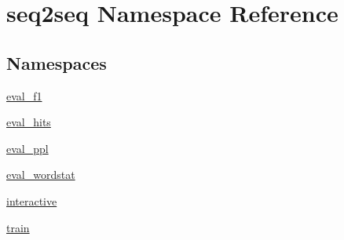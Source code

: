 \hypertarget{namespaceseq2seq}{}\section{seq2seq Namespace Reference}
\label{namespaceseq2seq}
\subsection*{Namespaces}
\begin{DoxyCompactItemize}
\item 
 \hyperlink{namespaceseq2seq_1_1eval__f1}{eval\+\_\+f1}
\item 
 \hyperlink{namespaceseq2seq_1_1eval__hits}{eval\+\_\+hits}
\item 
 \hyperlink{namespaceseq2seq_1_1eval__ppl}{eval\+\_\+ppl}
\item 
 \hyperlink{namespaceseq2seq_1_1eval__wordstat}{eval\+\_\+wordstat}
\item 
 \hyperlink{namespaceseq2seq_1_1interactive}{interactive}
\item 
 \hyperlink{namespaceseq2seq_1_1train}{train}
\end{DoxyCompactItemize}
